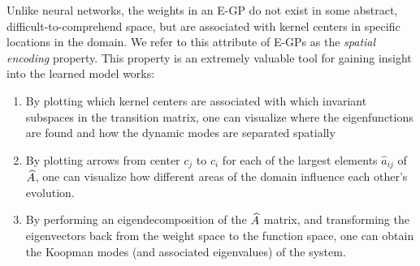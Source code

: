 Unlike neural networks, the weights in an E-GP do not exist in some abstract, difficult-to-comprehend space, but are associated with kernel centers in specific locations in the domain. We refer to this attribute of E-GPs as the \emph{spatial encoding} property. This property is an extremely valuable tool for gaining insight into the learned model works:
\begin{enumerate}
	\item By plotting which kernel centers are associated with which invariant subspaces in the transition matrix, one can visualize where the eigenfunctions are found and how the dynamic modes are separated spatially
	\item By plotting arrows from center $c_j$ to $c_i$ for each of the largest elements $\hat a_{ij}$ of $\widehat{A}$, one can visualize how different areas of the domain influence each other's evolution.
	\item By performing an eigendecomposition of the $\widehat{A}$ matrix, and transforming the eigenvectors back from the weight space to the function space, one can obtain the Koopman modes (and associated eigenvalues) of the system.
\end{enumerate}
